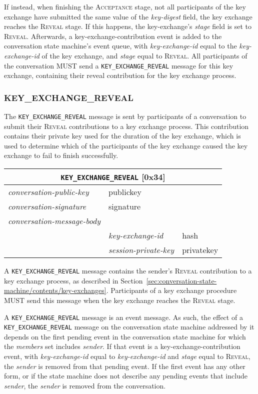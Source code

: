 \documentclass{article}
\def\npmessage#1{\texttt{#1}}
\def\field#1{\textit{#1}}
\def\smfield#1{\textsl{#1}}
\def\type#1{\textsf{#1}}
\newenvironment{conversationmessage}[2]{
\newcommand{\messagefield}[2]{
& \field{##1} & \type{##2} \\
\hline
}
\hspace{2em minus 2em}\begin{tabular}{|l|l|l|}
\hline
\multicolumn{3}{|c|}{\npmessage{#1} [#2]} \\
\hline
\hline
\field{conversation-public-key} & \multicolumn{2}{l|}{\type{publickey}} \\
\hline
\field{conversation-signature} & \multicolumn{2}{l|}{\type{signature}} \\
\hline
\field{conversation-message-body} & \multicolumn{2}{l|}{} \\
\hline
}{
\end{tabular}
}
\begin{document}
If instead, when finishing the \textsc{Acceptance} stage, not all participants of the key exchange have submitted the same value of the \smfield{key-digest} field, the key exchange reaches the \textsc{Reveal} stage.
If this happens, the \type{key-exchange}'s \smfield{stage} field is set to \textsc{Reveal}.
Afterwards, a \type{key-exchange-contribution} event is added to the conversation state machine's event queue, with \smfield{key-exchange-id} equal to the \smfield{key-exchange-id} of the key exchange, and \smfield{stage} equal to \textsc{Reveal}.
All participants of the conversation MUST send a \npmessage{KEY\_EXCHANGE\_REVEAL} message for this key exchange, containing their reveal contribution for the key exchange process.


\subsubsection{KEY\_EXCHANGE\_REVEAL}
\label{sec:messages/key-exchange-reveal}

The \npmessage{KEY\_EXCHANGE\_REVEAL} message is sent by participants of a conversation to submit their \textsc{Reveal} contributions to a key exchange process.
This contribution contains their private key used for the duration of the key exchange, which is used to determine which of the participants of the key exchange caused the key exchange to fail to finish successfully.

\begin{conversationmessage}{KEY\_EXCHANGE\_REVEAL}{0x34}
\messagefield{key-exchange-id}{hash}
\messagefield{session-private-key}{privatekey}
\end{conversationmessage}

A \npmessage{KEY\_EXCHANGE\_REVEAL} message contains the sender's \textsc{Reveal} contribution to a key exchange process, as described in Section~\ref{sec:conversation-state-machine/contents/key-exchanges}.
Participants of a key exchange procedure MUST send this message when the key exchange reaches the \textsc{Reveal} stage.

A \npmessage{KEY\_EXCHANGE\_REVEAL} message is an event message.
As such, the effect of a \npmessage{KEY\_EXCHANGE\_REVEAL} message on the conversation state machine addressed by it depends on the first pending event in the conversation state machine for which the \smfield{members} set includes \field{sender}.
If that event is a \type{key-exchange-contribution} event, with \smfield{key-exchange-id} equal to \field{key-exchange-id} and \smfield{stage} equal to \textsc{Reveal}, the \field{sender} is removed from that pending event.
If the first event has any other form, or if the state machine does not describe any pending events that include \field{sender}, the \field{sender} is removed from the conversation.
\end{document}
